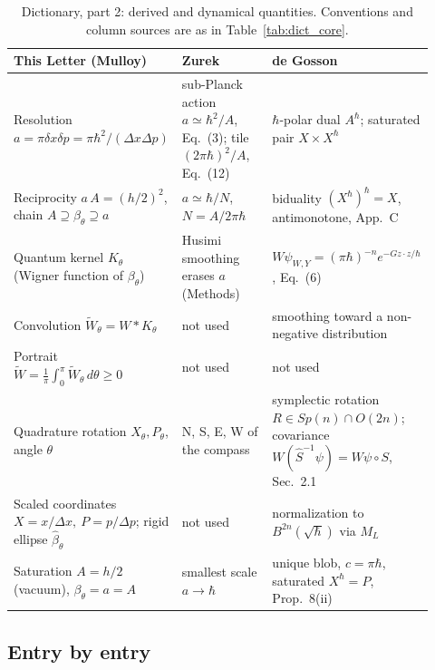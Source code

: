 \documentclass[%
  aps, amsmath, amssymb, onecolumn, 11pt
]{revtex4-2}
\begin{document}
\begin{table}[ht]
\centering
\raggedright
\renewcommand{\arraystretch}{1.35}
\begin{tabular}{@{}p{0.30\linewidth} p{0.28\linewidth} p{0.34\linewidth}@{}}
\toprule
\textbf{This Letter (Mulloy)} & \textbf{Zurek \cite{zurek2001}} & \textbf{de Gosson \cite{degosson2024reconstruction, degosson2022polar, degosson2013qblobs}} \\
\midrule
Resolution $a=\pi\delta x\delta p=\pi\hbar^2/(\Delta x\Delta p)$ & sub-Planck action $a\simeq\hbar^2/A$, Eq.~(3); tile $(2\pi\hbar)^2/A$, Eq.~(12) & $\hbar$-polar dual $A^\hbar$; saturated pair $X\times X^\hbar$ \\
Reciprocity $a\,A=(h/2)^2$, chain $A\supseteq \beta_\theta\supseteq a$ & $a\simeq\hbar/N$, $N=A/2\pi\hbar$ & biduality $(X^\hbar)^\hbar=X$, antimonotone, App.~C \\
Quantum kernel $K_\theta$ (Wigner function of $\beta_\theta$) & Husimi smoothing erases $a$ (Methods) & $W\psi_{W,Y}=(\pi\hbar)^{-n}e^{-Gz\cdot z/\hbar}$, Eq.~(6) \\
Convolution $\widetilde W_\theta=W*K_\theta$ & not used & smoothing toward a non-negative distribution \cite{degosson2005bullsci, cartwright1976} \\
Portrait $\widetilde W=\frac{1}{\pi}\!\int_0^\pi \widetilde W_\theta\,d\theta\ge 0$ & not used & not used \\
Quadrature rotation $X_\theta,P_\theta$, angle $\theta$ & N, S, E, W of the compass & symplectic rotation $R\in Sp(n)\cap O(2n)$; covariance $W(\hat S^{-1}\psi)=W\psi\circ S$, Sec.~2.1 \\
Scaled coordinates $X=x/\Delta x,\ P=p/\Delta p$; rigid ellipse $\hat \beta_\theta$ & not used & normalization to $B^{2n}(\sqrt{\hbar})$ via $M_L$ \\
Saturation $A=h/2$ (vacuum), $\beta_\theta=a=A$ & smallest scale $a\to\hbar$ & unique blob, $c=\pi\hbar$, saturated $X^\hbar=P$, Prop.~8(ii) \\
\bottomrule
\end{tabular}
\caption{Dictionary, part 2: derived and dynamical quantities. Conventions
and column sources are as in Table~\ref{tab:dict_core}.}
\label{tab:dict_derived}
\end{table}

\subsection{Entry by entry}
\label{sec:entries}
\end{document}
